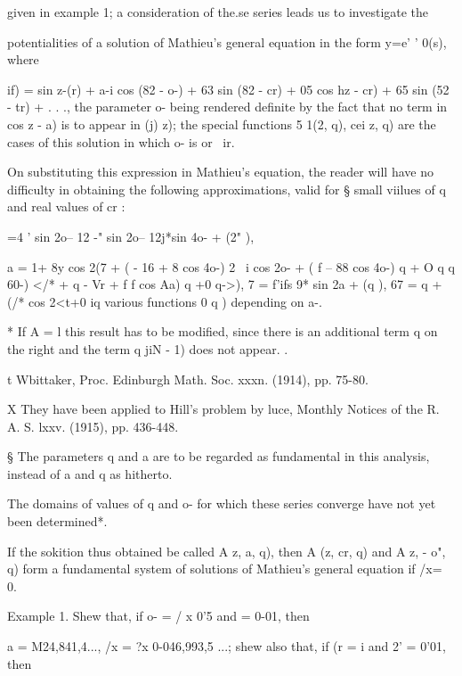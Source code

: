 {{given in example 1; a consideration of the.se series leads us
to investigate the

potentialities of a solution of Mathieu's general equation in the form
y=e' ' 0(s), where

  if) = sin z-(r) + a-i cos (82 - o-) + 63 sin (82 - cr) + 05 cos hz -
cr) + 65 sin (52 - tr) + . . ., the parameter o- being rendered
definite by the fact that no term in cos z - a) is to appear in (j)
z); the special functions 5 1(2, q), cei z, q) are the cases of this
solution in which o- is or \ ir.

On substituting this expression in Mathieu's equation, the reader will
have no difficulty in obtaining the following approximations, valid
for § small viilues of q and real values of cr :

  =4 ' sin 2o-- 12 -" sin 2o-- 12j*sin 4o- + (2" ),

a = 1+ 8y cos 2(7 + ( - 16 + 8 cos 4o-) 2 \ i cos 2o- + ( f -- 88 cos
4o-) q + O q%
q%
60-) </* + q%
- Vr + f f cos Aa) q +0 q->), 7 = f'ifs 9* sin 2a + (q ), 67 = q + (/*
cos 2<t+0 iq%
various functions 0 q ) depending on a-.

* If A = l this result has to be modified, since there is an
additional term q on the right and the term q jiN - 1) does not
appear. .

t Wbittaker, Proc. Edinburgh Math. Soc. xxxn. (1914), pp. 75-80.

X They have been applied to Hill's problem by luce, Monthly Notices of
the R. A. S. lxxv. (1915), pp. 436-448.

§ The parameters q and a are to be regarded as fundamental in this
analysis, instead of a and q as hitherto.

%
%

The domains of values of q and o- for which these series converge have
not yet been determined*.

If the sokition thus obtained be called A z, a, q), then A (z, cr, q)
and A z, - o", q) form a fundamental system of solutions of Mathieu's
general equation if /x= 0.

Example 1. Shew that, if o- = / x 0'5 and = 0-01, then

a = M24,841,4..., /x = ?x 0-046,993,5 ...; shew also that, if (r = i
and 2' = 0'01, then

}}
